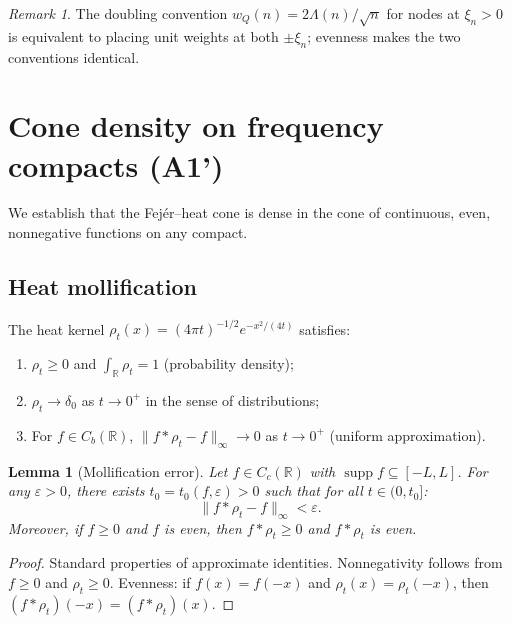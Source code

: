 \documentclass[11pt,a4paper]{article}
\newtheorem{lemma}[theorem]{Lemma}
\theoremstyle{definition}
\theoremstyle{remark}
\newtheorem{remark}[theorem]{Remark}
\newcommand{\R}{\mathbb{R}}
\DeclareMathOperator{\supp}{supp}
\begin{document}
\begin{remark}
The doubling convention $w_Q(n) = 2\Lambda(n)/\sqrt{n}$ for nodes at $\xi_n > 0$ is equivalent to placing unit weights at both $\pm \xi_n$; evenness makes the two conventions identical.
\end{remark}

\section{Cone density on frequency compacts (A1')}

We establish that the Fej\'er--heat cone is dense in the cone of continuous, even, nonnegative functions on any compact.

\subsection{Heat mollification}

The heat kernel $\rho_t(x) = (4\pi t)^{-1/2} e^{-x^2/(4t)}$ satisfies:
\begin{enumerate}[label=(\alph*)]
  \item $\rho_t \geq 0$ and $\int_\R \rho_t = 1$ (probability density);
  \item $\rho_t \to \delta_0$ as $t \to 0^+$ in the sense of distributions;
  \item For $f \in C_b(\R)$, $\|f * \rho_t - f\|_\infty \to 0$ as $t \to 0^+$ (uniform approximation).
\end{enumerate}

\begin{lemma}[Mollification error]\label{lem:mollification}
Let $f \in C_c(\R)$ with $\supp f \subseteq [-L, L]$. For any $\varepsilon > 0$, there exists $t_0 = t_0(f, \varepsilon) > 0$ such that for all $t \in (0, t_0]$:
\[
  \|f * \rho_t - f\|_\infty < \varepsilon.
\]
Moreover, if $f \geq 0$ and $f$ is even, then $f * \rho_t \geq 0$ and $f * \rho_t$ is even.
\end{lemma}

\begin{proof}
Standard properties of approximate identities. Nonnegativity follows from $f \geq 0$ and $\rho_t \geq 0$. Evenness: if $f(x) = f(-x)$ and $\rho_t(x) = \rho_t(-x)$, then $(f * \rho_t)(-x) = (f * \rho_t)(x)$.
\end{proof}
\end{document}
